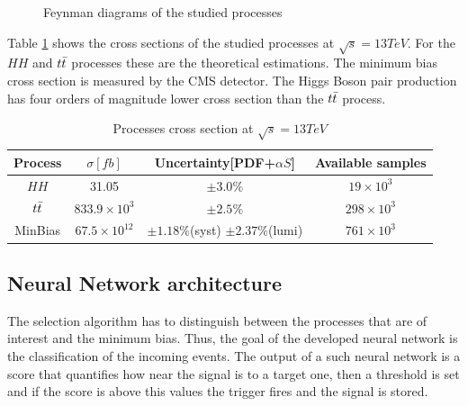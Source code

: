 \documentclass[../../main.tex]{subfiles}
\begin{document}
\begin{figure}[htp]
    \begin{minipage}{0.5\linewidth}
        \centering
    \end{minipage}%
    \begin{minipage}{0.5\linewidth}
        \centering
    \end{minipage}%
    
    \caption{Feynman diagrams of the studied processes}
    \label{fig:fayman}
    
\end{figure}


Table \ref{tab:cross_sec_table} shows the cross sections of the studied processes at $\sqrt{s} = 13 TeV$. For the $HH$ and $t\Bar {t}$ processes these are the theoretical estimations. The minimum bias cross section is measured by the CMS detector. The Higgs Boson pair production has four orders of magnitude lower cross section than the $t\Bar {t}$ process.

\begin{center}
    \begin{table}[h]
    \centering
    \begin{tabular}{|c|c|c|c|}
        \hline
        Process & $\sigma[fb]$ & Uncertainty[PDF+$\alpha S$] & Available samples \\
        \hline
        $HH$         & 31.05 & $\pm 3.0 \%$ & $19\times10^3$ \\
        $t\Bar {t}$  & $833.9\times 10^{3}$ & $\pm 2.5 \%$ & $298\times10^3$ \\
        MinBias & $67.5\times 10^{12}$ & $\pm 1.18 \%$(syst) $\pm 2.37 \%$(lumi) & $761\times10^3$ \\
        \hline
    \end{tabular}
    \caption{Processes cross section at $\sqrt{s}=13TeV$}
    \label{tab:cross_sec_table}
    \end{table}
\end{center}

\subsection{Neural Network architecture}
\label{P2GT_NN}
The selection algorithm has to distinguish between the processes that are of interest and the minimum bias. Thus, the goal of the developed neural network is the classification of the incoming events. The output of a such neural network is a score that quantifies how near the signal is to a target one, then a threshold is set and if the score is above this values the trigger fires and the signal is stored. 
\end{document}
